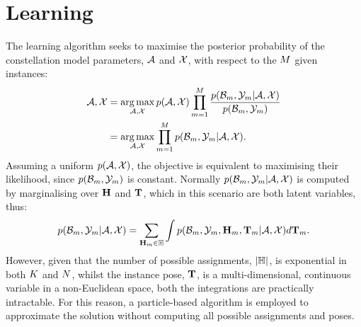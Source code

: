 \section{Learning}
\label{sec/reg/learning}

The learning algorithm seeks to maximise the posterior probability of the constellation model parameters, $\mathcal{A}$ and $\mathcal{X}$, with respect to the $M$ given instances:  
\begin{equation}
	\begin{aligned}
		\mathcal{A},\mathcal{X} & = \operatorname*{arg\,max}_{\mathcal{A}, \mathcal{X}}
		p(\mathcal{A},\mathcal{X})
		\prod_{m=1}^M 
		\frac{p(\mathcal{B}_m,\mathcal{Y}_m|\mathcal{A},\mathcal{X})}{p(\mathcal{B}_m,\mathcal{Y}_m)} \\ 
		& = \operatorname*{arg\,max}_{\mathcal{A}, \mathcal{X}}
		\prod_{m=1}^M 
		p(\mathcal{B}_m,\mathcal{Y}_m|\mathcal{A},\mathcal{X}).
	\end{aligned}
\end{equation}
Assuming a uniform $p(\mathcal{A},\mathcal{X})$, the objective is equivalent to maximising their likelihood, since $p(\mathcal{B}_m,\mathcal{Y}_m)$ is constant.  
Normally $p(\mathcal{B}_m, \mathcal{Y}_m | \mathcal{A}, \mathcal{X})$ is computed by marginalising over $\mathbf{H}$ and $\mathbf{T}$, which in this scenario are both latent variables, thus:
\begin{equation}
	p(\mathcal{B}_m,\mathcal{Y}_m|\mathcal{A},\mathcal{X}) = 
	\sum_{\mathbf{H}_m \in \mathbb{H}}
	\displaystyle\int
	p(\mathcal{B}_m,\mathcal{Y}_m,\mathbf{H}_m,\mathbf{T}_m|\mathcal{A},\mathcal{X}) d\mathbf{T}_{m}.
	\label{eqn/reg/learningobjective}
\end{equation}
However, given that the number of possible assignments, $|\mathbb{H}|$, is exponential in both $K$ and $N$, whilst the instance pose, $\mathbf{T}$, is a multi-dimensional, continuous variable in a non-Euclidean space, both the integrations are practically intractable. For this reason, a particle-based algorithm is employed to approximate the solution without computing all possible assignments and poses.  

